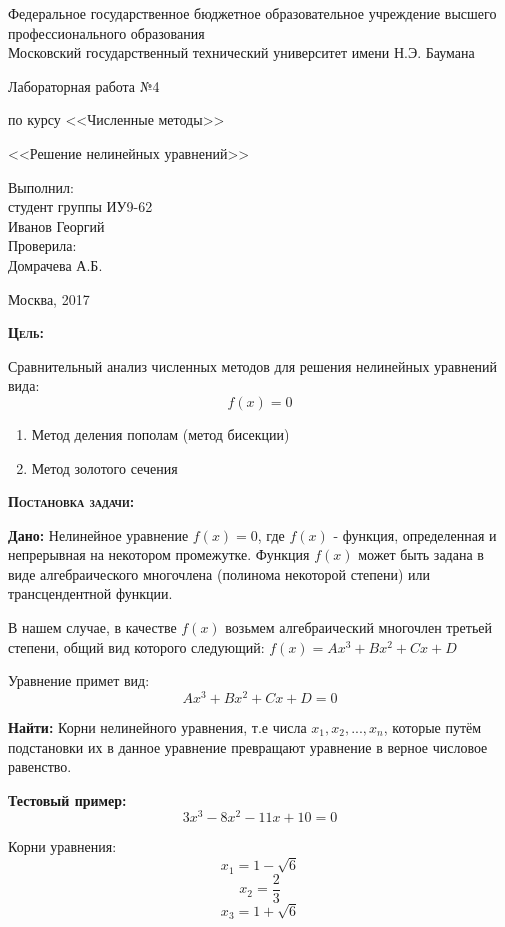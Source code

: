 \documentclass [12pt]{article}
\title{}
\date{}
\author{}
\begin{document}
\begin{titlepage}
\thispagestyle{empty}
\begin{center}
Федеральное государственное бюджетное образовательное учреждение высшего профессионального образования \\Московский государственный технический университет имени Н.Э. Баумана

\end{center}
\vfill
\centerline{\large{Лабораторная работа №4}}
\centerline{\large{по курсу <<Численные методы>>}}
\centerline{\large{<<Решение нелинейных уравнений>>}}
\vfill
\hfill\parbox{5cm} {
           Выполнил:\\
           студент группы ИУ9-62 \hfill \\
           Иванов Георгий\hfill \medskip\\
           Проверила:\\
           Домрачева А.Б.\hfill
       }
\centerline{Москва, 2017}
\clearpage
\end{titlepage}

\textsc{\textbf{Цель:}} 

Сравнительный анализ численных методов для решения нелинейных уравнений вида: $$f(x)=0$$
\begin{enumerate}
\item Метод деления пополам (метод бисекции)
\item Метод золотого сечения
\end{enumerate}

\textsc{\textbf{Постановка задачи:}}

\textbf{Дано:}  Нелинейное уравнение $f(x)=0$, где $f(x)$ - функция, определенная и непрерывная на некотором промежутке. Функция $f(x)$ может быть задана в виде алгебраического многочлена (полинома некоторой степени) или трансцендентной функции.

В нашем случае, в качестве $f(x)$ возьмем алгебраический многочлен третьей степени, общий вид которого следующий: $f(x)=Ax^3+Bx^2+Cx+D$

Уравнение примет вид:  $$Ax^3+Bx^2+Cx+D=0$$

 \textbf{Найти:} Корни нелинейного уравнения, т.е числа $x_1, x_2, ... , x_n$, которые путём подстановки их в данное уравнение превращают уравнение в верное числовое равенство.

\textbf{Тестовый пример:} $$ 3x^3-8x^2-11x+10=0$$ 

 Корни уравнения:
$$x_1 = 1-\sqrt{6}$$ 
$$x_2 = \frac{2}{3}$$
$$x_3 = 1+\sqrt{6}$$
\end{document}
